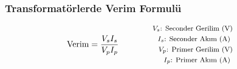 \subsubsection*{Transformatörlerde Verim Formulü}
\begin{equation}
  \text{Verim} = \frac{V_s I_s}{V_p I_p}\qquad \qquad \parbox{4cm}{\footnotesize$\begin{aligned}
      V_s\text{: Seconder Gerilim (V)} \\
      I_s\text{: Seconder Akım (A) } \\
      V_p\text{: Primer Gerilim (V)} \\
      I_p\text{: Primer Akım (A) }
\end{aligned}$}
\end{equation}
